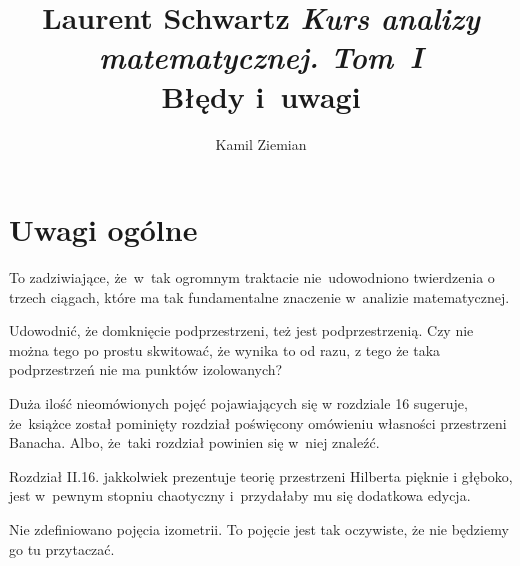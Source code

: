 \documentclass[a4paper,11pt]{article}
\title{Laurent Schwartz \textit{Kurs analizy matematycznej. Tom~I} \\
  {\Large Błędy i~uwagi}}
\author{Kamil Ziemian}
\numberwithin{equation}{section}
\begin{document}





\maketitle %





\section{Uwagi ogólne}


\noindent
To zadziwiające, że~w~tak ogromnym traktacie nie~udowodniono
twierdzenia o trzech ciągach, które ma tak fundamentalne znaczenie
w~analizie matematycznej.

\VerSpaceFour





\noindent
Udowodnić, że domknięcie podprzestrzeni, też jest podprzestrzenią. Czy
nie można tego po prostu skwitować, że wynika to od razu, z tego że
taka podprzestrzeń nie ma punktów izolowanych?

\VerSpaceFour





\noindent
Duża ilość nieomówionych pojęć pojawiających się w rozdziale 16
sugeruje, że~książce został pominięty rozdział poświęcony omówieniu
własności przestrzeni Banacha. Albo, że~taki rozdział powinien się
w~niej znaleźć.

\VerSpaceFour





\noindent
Rozdział II.16. jakkolwiek prezentuje teorię przestrzeni Hilberta
pięknie i głęboko, jest w~pewnym stopniu chaotyczny i~przydałaby mu
się dodatkowa edycja.

\VerSpaceFour





\noindent
Nie zdefiniowano pojęcia izometrii. To pojęcie jest tak oczywiste, że
nie będziemy go tu przytaczać.

\VerSpaceFour
\end{document}
